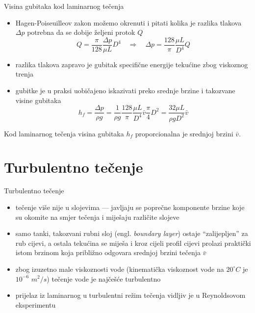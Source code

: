 \documentclass[croatian]{beamer}
\begin{document}
\begin{frame}{Visina gubitaka kod laminarnog tečenja}

\begin{itemize}
\item Hagen-Poiseuilleov zakon možemo okrenuti i pitati kolika je razlika
tlakova $\Delta p$ potrebna da se dobije željeni protok $Q$
\[
Q=\frac{\pi}{128}\frac{\Delta p}{\mu L}D^{4}\quad\Rightarrow\quad\Delta p=\frac{128}{\pi}\frac{\mu L}{D^{4}}Q
\]
\item razlika tlakova zapravo je gubitak specifične energije tekućine zbog
viskoznog trenja
\item gubitke je u praksi uobičajeno iskazivati preko srednje brzine i takozvane\emph{
}\alert{visine gubitaka}
\[
h_{f}=\frac{\Delta p}{\rho g}=\frac{1}{\rho g}\frac{128}{\pi}\frac{\mu L}{D^{4}}\bar{v}\frac{\pi}{4}D^{2}=\frac{32\mu L}{\rho gD^{2}}\bar{v}
\]
\end{itemize}
\begin{alertblock}{}

Kod laminarnog tečenja visina gubitaka $h_{f}$ proporcionalna je
srednjoj brzini $\bar{v}$.
\end{alertblock}
\end{frame}

\section{Turbulentno tečenje}
\begin{frame}{Turbulentno tečenje}

\begin{itemize}
\item tečenje više nije u slojevima --- javljaju se poprečne komponente
brzine koje su okomite na smjer tečenja i miješaju različite slojeve
\item samo tanki, takozvani \alert{rubni sloj} (engl. \emph{boundary layer})
ostaje ``zalijepljen'' za rub cijevi, a ostala tekućina se miješa
i kroz cijeli profil cijevi prolazi praktički istom brzinom koja približno
odgovara srednjoj brzini tečenja $\bar{v}$
\item zbog izuzetno male viskoznosti vode (kinematička viskoznost vode na
$20^\circ C$ je $10^{-6}$ $m^{2}/s$) tečenje vode je najčešće turbulentno
\item prijelaz iz laminarnog u turbulentni režim tečenja vidljiv je u \alert{Reynoldsovom eksperimentu}
\end{itemize}
\end{frame}
\end{document}
